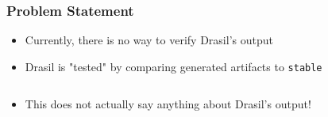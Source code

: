 \documentclass{beamer}
\begin{document}
\begin{frame}
    \frametitle{Problem Statement}
    \begin{itemize}
        \item Currently, there is no way to verify Drasil's output
        \item <2-> Drasil is "tested" by comparing generated
              artifacts to \texttt{stable}
              \begin{columns}[T,onlytextwidth]
                  \begin{column}{.4\textwidth}
                  \end{column}
                  \begin{column}{.6\textwidth}
                      \vspace{-2mm}
                  \end{column}
              \end{columns}
        \item <3-> This does not actually say anything about Drasil's output!
    \end{itemize}
\end{frame}
\end{document}
